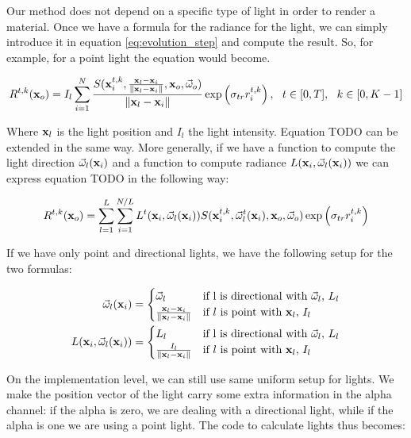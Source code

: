 Our method does not depend on a specific type of light in order to render a material. Once we have a formula for the radiance for the light, we can simply introduce it in equation \ref{eq:evolution_step} and compute the result. So, for example, for a point light the equation would become.

$$
R^{t,k}(\x_o) = {I_l} \sum_{i = 1}^N  \frac{S(\x^{t,k}_i, \frac{\x_l - \x_i}{\|\x_l - \x_i\|}, \x_o, \vomega_o)}{{\|\x_l - \x_i\|}} \exp\left(\sigma_{tr} r^{t,k}_i\right), \ \ t \in [0,T], \ \ k \in [0,K-1] 
\label{eq:evolution_step_2}
$$

Where $\mathbf{x}_l$ is the light position and $I_l$ the light intensity. Equation TODO can be extended in the same way. More generally, if we have a function to compute the light direction $\vec{\omega}_l(\mathbf{x}_i)$ and a function to compute radiance $L(\mathbf{x}_i, \vec{\omega}_l(\mathbf{x}_i))$ we can express equation TODO in the following way:

$$
R^{t,k}(\mathbf{x}_o) = \sum_{l = 1}^L \sum_{i = 1}^{N/L} L^t(\mathbf{x}_i, \vec{\omega}_l(\mathbf{x}_i)) S(\mathbf{x}^{t,k}_i, \vec{\omega}_l^t(\mathbf{x}_i), \mathbf{x}_o, \vec{\omega}_o) \exp\left(\sigma_{tr} r^{t,k}_i\right)
$$

If we have only point and directional lights, we have the following setup for the two formulas:

\begin{equation*}
\begin{split}
\vec{\omega}_l(\mathbf{x}_i) &= \begin{cases}
\vec{\omega}_l & \text{if l is directional with $\vec{\omega}_l$, $L_l$} \\
 \frac{\mathbf{x}_l - \mathbf{x}_i}{\|\mathbf{x}_l - \mathbf{x}_i\|} & \text{if $l$ is point with $\mathbf{x}_l$, $I_l$}
\end{cases} \\
L(\mathbf{x}_i, \vec{\omega}_l(\mathbf{x}_i)) &= \begin{cases}
L_l & \text{if l is directional with $\vec{\omega}_l$, $L_l$} \\
 \frac{I_l}{\|\mathbf{x}_l - \mathbf{x}_i\|} & \text{if $l$ is point with $\mathbf{x}_l$, $I_l$}
\end{cases} \\
\end{split}
\end{equation*}

On the implementation level, we can still use same uniform setup for lights. We make the position vector of the light carry some extra information in the alpha channel: if the alpha is zero, we are dealing with a directional light, while if the alpha is one we are using a point light. The code to calculate lights thus becomes:

